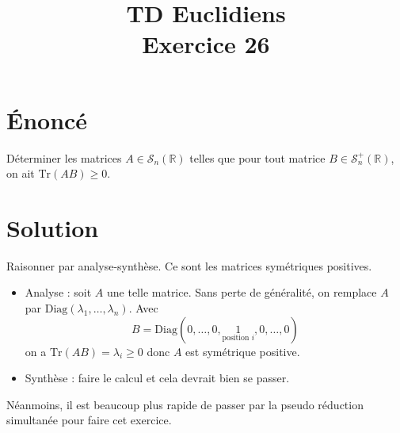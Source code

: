 \documentclass[french]{article}
\title{TD Euclidiens\\ Exercice 26}
\date{}
\newcommand{\R}{\mathbb{R}}
\newcommand{\Tr}{\text{Tr}}
\begin{document}
\maketitle

\section{Énoncé}
Déterminer les matrices $A\in\mathcal{S}_n(\R)$ telles que pour tout matrice $B\in\mathcal{S}_n^+(\R)$, on ait $\Tr(AB)\geqslant0$.
\section{Solution}
Raisonner par analyse-synthèse. Ce sont les matrices symétriques positives.
\begin{itemize}
	\item Analyse : soit $A$ une telle matrice. Sans perte de généralité, on remplace $A$ par $\text{Diag}(\lambda_1,\ldots,\lambda_n)$. Avec $$B=\text{Diag}(0,\ldots,0,\underset{\text{position }i}{1},0,\ldots,0)$$ on a $\Tr(AB)=\lambda_i\geqslant 0$ donc $A$ est symétrique positive.
	\item Synthèse : faire le calcul et cela devrait bien se passer.
\end{itemize} Néanmoins, il est beaucoup plus rapide de passer par la pseudo réduction simultanée pour faire cet exercice.
\end{document}
